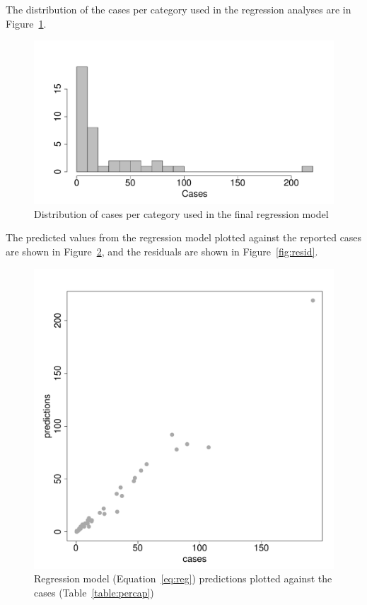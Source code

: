 \documentclass{article}
\begin{document}
The distribution of the cases per category used in the regression analyses are in Figure~\ref{fig:histcasecat}.
\begin{figure}[h!]
\begin{center}
\includegraphics{interimreport2-014}
\end{center}
\caption{Distribution of cases per category used in the final regression model}
\label{fig:histcasecat}
\end{figure}

The predicted values from the regression model plotted against the reported cases are shown in Figure~\ref{fig:predict}, and the residuals are shown in Figure~\ref{fig:resid}.
\begin{figure}[h!]
\begin{center}
\includegraphics{interimreport2-015}
\end{center}
\caption{Regression model (Equation~\ref{eq:reg}) predictions plotted against the cases (Table~\ref{table:percap})}
\label{fig:predict}
\end{figure}
\end{document}
